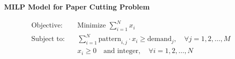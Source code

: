 \documentclass{article}
\begin{document}
\textbf{MILP Model for Paper Cutting Problem}

\begin{align*}
\text{Objective:} \quad & \text{Minimize } \sum_{i=1}^{N} x_i \\
\text{Subject to:} \quad & \sum_{i=1}^{N} \text{pattern}_{i,j} \cdot x_i \geq \text{demand}_j, \quad \forall j = 1, 2, \ldots, M \\
& x_i \geq 0 \quad \text{and integer}, \quad \forall i = 1, 2, \ldots, N
\end{align*}
\end{document}
